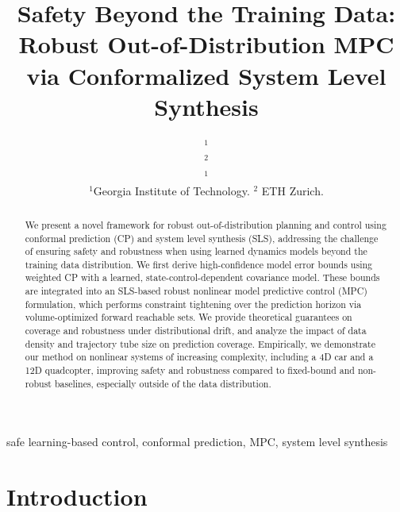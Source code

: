 \documentclass{l4dc2026}
\title[Robust Out-of-Distribution MPC via Conformalized System Level Synthesis]{Safety Beyond the Training Data: Robust Out-of-Distribution MPC via Conformalized System Level Synthesis}
\author{%
 \Name{Anutam Srinivasan}$^{1}$ \Email{asrinivasan350@gatech.edu}\\
 \Name{Antoine Leeman}$^{2}$ \Email{aleeman@ethz.ch}\\
 \Name{Glen Chou}$^1$ \Email{chou@gatech.edu}\\
 \addr $^1$Georgia Institute of Technology. $^2$ ETH Zurich.%
}
\begin{document}
\maketitle
\vspace{-20pt}
\begin{abstract}%
We present a novel framework for robust out-of-distribution planning and control using conformal prediction (CP) and system level synthesis (SLS), addressing the challenge of ensuring safety and robustness when using learned dynamics models beyond the training data distribution. We first derive high-confidence model error bounds using weighted CP with a learned, state-control-dependent covariance model. These bounds are integrated into an SLS-based robust nonlinear model predictive control (MPC) formulation, which performs constraint tightening over the prediction horizon via volume-optimized forward reachable sets. We provide theoretical guarantees on coverage and robustness under distributional drift, and analyze the impact of data density and trajectory tube size on prediction coverage. Empirically, we demonstrate our method on nonlinear systems of increasing complexity, including a 4D car and a {12D} quadcopter, improving safety and robustness compared to fixed-bound and non-robust baselines, especially outside of the data distribution.
\end{abstract}

\begin{keywords}%
  safe learning-based control, conformal prediction, MPC, system level synthesis%
\end{keywords}

\vspace{-12pt}
\section{Introduction}
\vspace{-3pt}
\end{document}
